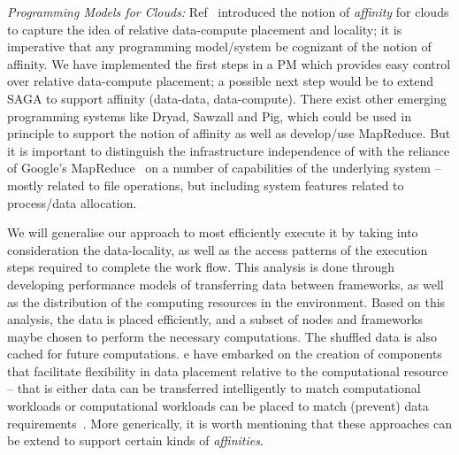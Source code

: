 \documentclass[3p,twocolumn]{elsarticle}
\begin{document}
{\it Programming Models for Clouds: } Ref~\cite{jha_ccpe09} introduced
the notion of {\it affinity} for clouds to capture the idea of
relative data-compute placement and locality; it is imperative that
any programming model/system be cognizant of the notion of
affinity. We have implemented the first steps in a PM which provides
easy control over relative data-compute placement; a possible next
step would be to extend SAGA to support affinity (data-data,
data-compute).  There exist other emerging programming systems like
Dryad, Sawzall and Pig, which could be used in principle to support
the notion of affinity as well as develop/use MapReduce.  But it is
important to distinguish the infrastructure independence of
\sagamapreduce with the reliance of Google's
MapReduce~\cite{mapreduce-paper} on a number of capabilities of the
underlying system -- mostly related to file operations, but including
system features related to process/data allocation.

We will generalise our approach to most efficiently execute it by
taking into consideration the data-locality, as well as the access
patterns of the execution steps required to complete the work
flow. This analysis is done through developing performance models of
transferring data between frameworks, as well as the distribution of
the computing resources in the environment. Based on this analysis,
the data is placed efficiently, and a subset of nodes and frameworks
maybe chosen to perform the necessary computations. The shuffled data
is also cached for future computations.  e have embarked on the
creation of components that facilitate flexibility in data placement
relative to the computational resource -- that is either data can be
transferred intelligently to match computational workloads or
computational workloads can be placed to match (prevent) data
requirements~\cite{???}. More generically, it is worth mentioning that
these approaches can be extend to support certain kinds of {\it
  affinities}.



\end{document}
